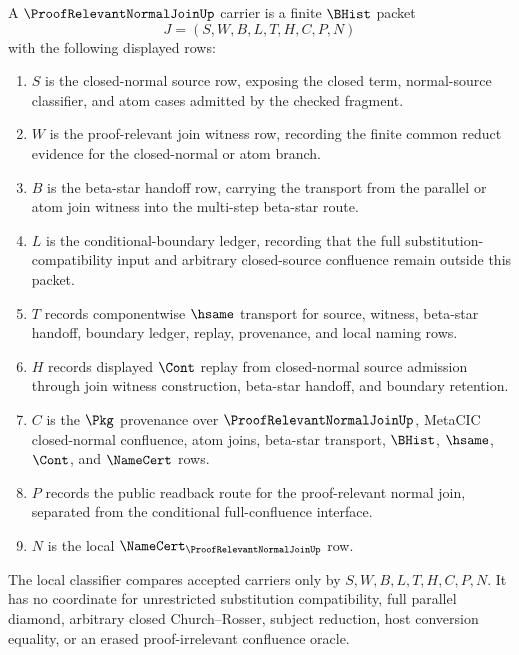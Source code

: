 \begin{definition}\label{def:proof-relevant-normal-join-carrier}
A $\ProofRelevantNormalJoinUp$ carrier is a finite $\BHist$ packet
$$
J=(S,W,B,L,T,H,C,P,N)
$$
with the following displayed rows:
\begin{enumerate}
\item $S$ is the closed-normal source row, exposing the closed term, normal-source classifier, and atom cases admitted by the checked fragment.
\item $W$ is the proof-relevant join witness row, recording the finite common reduct evidence for the closed-normal or atom branch.
\item $B$ is the beta-star handoff row, carrying the transport from the parallel or atom join witness into the multi-step beta-star route.
\item $L$ is the conditional-boundary ledger, recording that the full substitution-compatibility input and arbitrary closed-source confluence remain outside this packet.
\item $T$ records componentwise $\hsame$ transport for source, witness, beta-star handoff, boundary ledger, replay, provenance, and local naming rows.
\item $H$ records displayed $\Cont$ replay from closed-normal source admission through join witness construction, beta-star handoff, and boundary retention.
\item $C$ is the $\Pkg$ provenance over $\ProofRelevantNormalJoinUp$, MetaCIC closed-normal confluence, atom joins, beta-star transport, $\BHist$, $\hsame$, $\Cont$, and $\NameCert$ rows.
\item $P$ records the public readback route for the proof-relevant normal join, separated from the conditional full-confluence interface.
\item $N$ is the local $\NameCert_{\ProofRelevantNormalJoinUp}$ row.
\end{enumerate}
The local classifier compares accepted carriers only by $S,W,B,L,T,H,C,P,N$. It has no coordinate for unrestricted substitution compatibility, full parallel diamond, arbitrary closed Church--Rosser, subject reduction, host conversion equality, or an erased proof-irrelevant confluence oracle.
\end{definition}

